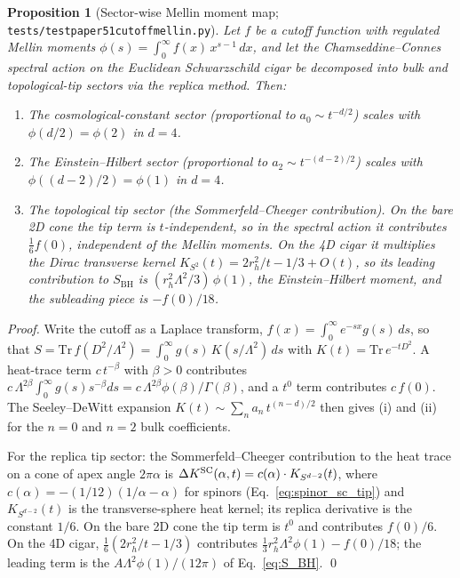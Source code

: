 \documentclass[11pt,a4paper]{article}
\theoremstyle{plain}
\newtheorem{proposition}[theorem]{Proposition}
\theoremstyle{definition}
\newcommand{\BH}{\mathrm{BH}}
\renewcommand{\_}{\textunderscore\allowbreak}
\begin{document}
\begin{proposition}[Sector-wise Mellin moment map; \texttt{tests/test\_paper51\_cutoff\_mellin.py}]
\label{thm:sector_mellin}
Let $f$ be a cutoff function with regulated Mellin moments
$\phi(s) = \int_0^\infty f(x)\, x^{s-1}\, dx$, and let the
Chamseddine--Connes spectral action on the Euclidean Schwarzschild
cigar be decomposed into bulk and topological-tip sectors via the
replica method. Then:
\begin{enumerate}
  \item[\emph{(i)}] The cosmological-constant sector (proportional to
    $a_0 \sim t^{-d/2}$) scales with $\phi(d/2) = \phi(2)$ in $d=4$.
  \item[\emph{(ii)}] The Einstein--Hilbert sector (proportional to
    $a_2 \sim t^{-(d-2)/2}$) scales with $\phi((d-2)/2) = \phi(1)$ in $d=4$.
  \item[\emph{(iii)}] The topological tip sector (the
    Sommerfeld--Cheeger contribution).  On the bare 2D cone the tip
    term is $t$-independent, so in the spectral action it contributes
    $\tfrac16 f(0)$, independent of the Mellin moments.  On the 4D cigar
    it multiplies the Dirac transverse kernel
    $K_{S^2}(t) = 2r_h^2/t - 1/3 + O(t)$, so its leading contribution to
    $S_{\BH}$ is $(r_h^2\Lambda^2/3)\,\phi(1)$, the Einstein--Hilbert
    moment, and the subleading piece is $-f(0)/18$.
\end{enumerate}
\end{proposition}

\begin{proof}
Write the cutoff as a Laplace transform, $f(x) = \int_0^\infty
e^{-sx} g(s)\,ds$, so that $S = \mathrm{Tr}\, f(D^2/\Lambda^2) =
\int_0^\infty g(s)\, K(s/\Lambda^2)\, ds$ with $K(t) = \mathrm{Tr}\,
e^{-tD^2}$.  A heat-trace term $c\,t^{-\beta}$ with $\beta > 0$
contributes $c\,\Lambda^{2\beta} \int_0^\infty g(s) s^{-\beta} ds
= c\,\Lambda^{2\beta}\phi(\beta)/\Gamma(\beta)$, and a $t^0$ term
contributes $c\,f(0)$.  The Seeley--DeWitt expansion
$K(t) \sim \sum_n a_n\, t^{(n-d)/2}$ then gives (i) and (ii) for the
$n=0$ and $n=2$ bulk coefficients.

For the replica tip sector: the Sommerfeld--Cheeger contribution to the
heat trace on a cone of apex angle $2\pi\alpha$ is
$\Delta K^{\rm SC}(\alpha, t) = c(\alpha) \cdot K_{S^{d-2}}(t)$,
where $c(\alpha) = -(1/12)(1/\alpha - \alpha)$ for spinors
(Eq.~\eqref{eq:spinor_sc_tip}) and
$K_{S^{d-2}}(t)$ is the transverse-sphere heat kernel; its replica
derivative is the constant $1/6$.  On the bare 2D cone the tip term is
$t^0$ and contributes $f(0)/6$.  On the 4D cigar,
$\tfrac16 (2r_h^2/t - 1/3)$ contributes
$\tfrac13 r_h^2\Lambda^2\phi(1) - f(0)/18$; the leading term is the
$A\Lambda^2\phi(1)/(12\pi)$ of Eq.~\eqref{eq:S_BH}. \qed
\end{proof}
\end{document}
